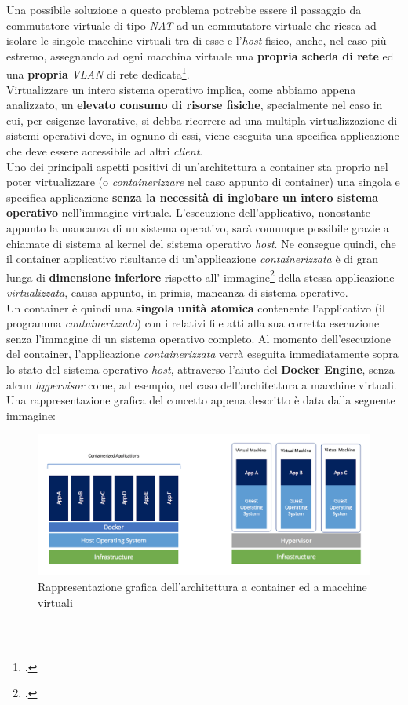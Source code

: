 Una possibile soluzione a questo problema potrebbe essere il passaggio da commutatore virtuale di tipo \textit{NAT} ad un commutatore virtuale che riesca ad isolare le singole macchine virtuali tra di esse e l'\textit{host} fisico, anche, nel caso più estremo, assegnando ad ogni macchina virtuale una \textbf{propria scheda di rete} ed una \textbf{propria} \textit{\gls{VLAN}} di rete dedicata\footcite{per creare o impostare una VLAN, fare riferimento al router/firewall o allo switch di rete}.\\
Virtualizzare un intero sistema operativo implica, come abbiamo appena analizzato, un \textbf{elevato consumo di risorse fisiche}, specialmente nel caso in cui, per esigenze lavorative, si debba ricorrere ad una multipla virtualizzazione di sistemi operativi dove, in ognuno di essi, viene eseguita una specifica applicazione che deve essere accessibile ad altri \textit{client}.\\
Uno dei principali aspetti positivi di un'architettura a container sta proprio nel poter virtualizzare (o \textit{containerizzare} nel caso appunto di container) una singola e specifica applicazione \textbf{senza la necessità di inglobare un intero sistema operativo} nell'immagine virtuale. L'esecuzione dell'applicativo, nonostante appunto la mancanza di un sistema operativo, sarà comunque possibile grazie a chiamate di sistema al kernel del sistema operativo \textit{host}. Ne consegue quindi, che il container applicativo risultante di un'applicazione \textit{containerizzata} è di gran lunga di \textbf{dimensione inferiore} rispetto all' immagine\footcite{inteso come dimensione in Gb del virtual disk image (*.vdi) dell'immagine virtualizzata} della stessa applicazione \textit{virtualizzata}, causa appunto, in primis, mancanza di sistema operativo.\\
Un container è quindi una \textbf{singola unità atomica} contenente l'applicativo (il programma \textit{containerizzato}) con i relativi file atti alla sua corretta esecuzione senza l'immagine di un sistema operativo completo.
Al momento dell'esecuzione del container, l'applicazione \textit{containerizzata} verrà eseguita immediatamente sopra lo stato del sistema operativo \textit{host}, attraverso l'aiuto del \textbf{\gls{Docker Engine}}, senza alcun \textit{\gls{hypervisor}} come, ad esempio, nel caso dell'architettura a macchine virtuali. \\
Una rappresentazione grafica del concetto appena descritto è data dalla seguente immagine:
\begin{figure}[!h]     
\centering 
    \includegraphics[width=0.6\columnwidth]{immagini/img/container_vs_vm} 
    \caption{Rappresentazione grafica dell'architettura a container ed a macchine virtuali}
\end{figure} \\
